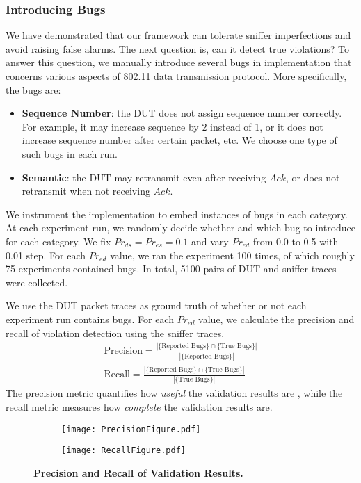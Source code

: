 \subsubsection{Introducing Bugs}

We have demonstrated that our framework can tolerate sniffer imperfections and
avoid raising false alarms.  The next question is, can it detect true
violations?  To answer this question, we manually introduce several bugs in
\ns{} implementation that concerns various aspects of 802.11 data transmission
protocol.  More specifically, the bugs are:

\begin{itemize}
  \item \textbf{Sequence Number}: the DUT does not assign sequence number
    correctly. For example, it may increase sequence by 2 instead of 1, or it
    does not increase sequence number after certain packet, etc. We choose one
    type of such bugs in each run.
  \item \textbf{Semantic}: the DUT may retransmit even
    after receiving $Ack$, or does not retransmit when not receiving $Ack$.
\end{itemize}

We instrument the \ns{} implementation to embed instances of bugs in each
category. At each experiment run, we randomly decide whether and which bug to
introduce for each category. We fix $Pr_{ds}=Pr_{es}=0.1$ and vary $Pr_{ed}$
from 0.0 to 0.5 with 0.01 step. For each $Pr_{ed}$ value, we ran the experiment
100 times, of which roughly 75 experiments contained bugs. In total, 5100 pairs of
DUT and sniffer traces were collected.


We use the DUT packet traces as ground truth of whether or not each experiment
run contains bugs.
For each $Pr_{ed}$ value, we calculate the precision and recall of violation
detection using the sniffer traces.%
\begin{align}
  \text{Precision} = \frac{\left\vert \{\text{Reported Bugs}\} \cap \{\text{True Bugs}\}\right\vert}{\left\vert
  \{\text{Reported Bugs}\}\right\vert}\\
  \text{Recall} = \frac{\left\vert \{\text{Reported Bugs}\} \cap \{\text{True Bugs}\}\right\vert}{\left\vert
  \{\text{True Bugs}\}\right\vert}
\end{align}%
The precision metric quantifies how \textit{useful} the validation results are ,
while the recall metric measures how \textit{complete} the validation results
are.

\begin{figure}[t!]
  \centering
  \begin{subfigure}{0.48\textwidth}
    \texttt{[image: PrecisionFigure.pdf]}
  \end{subfigure}
  \begin{subfigure}{0.48\textwidth}
    \texttt{[image: RecallFigure.pdf]}
  \end{subfigure}
  \caption{\textbf{Precision and Recall of Validation Results.}}
  \label{fig:precision}
\end{figure}

